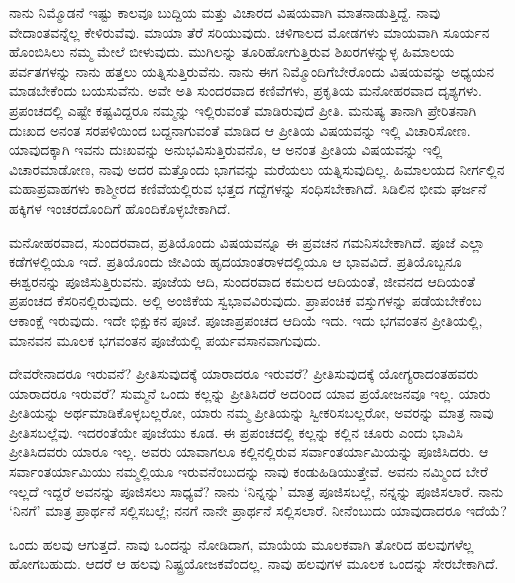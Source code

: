 ನಾನು ನಿಮ್ಮೊಡನೆ ಇಷ್ಟು ಕಾಲವೂ ಬುದ್ದಿಯ ಮತ್ತು ವಿಚಾರದ ವಿಷಯವಾಗಿ ಮಾತನಾಡುತ್ತಿದ್ದೆ. ನಾವು ವೇದಾಂತವನ್ನೆಲ್ಲ ಕೇಳಿರುವೆವು. ಮಾಯಾ ತೆರೆ ಸರಿಯುವುದು. ಚಳಿಗಾಲದ ಮೋಡಗಳು ಮಾಯವಾಗಿ ಸೂರ್ಯನ ಹೊಂಬಿಸಿಲು ನಮ್ಮ ಮೇಲೆ ಬೀಳುವುದು. ಮುಗಿಲನ್ನು ತೂರಿಹೋಗುತ್ತಿರುವ ಶಿಖರಗಳನ್ನುಳ್ಳ ಹಿಮಾಲಯ ಪರ್ವತಗಳನ್ನು ನಾನು ಹತ್ತಲು ಯತ್ನಿಸುತ್ತಿರುವೆನು. ನಾನು ಈಗ ನಿಮ್ಮೊಂದಿಗೆ\break ಬೇರೊಂದು ವಿಷಯವನ್ನು ಅಧ್ಯಯನ ಮಾಡಬೇಕೆಂದು ಬಯಸುವೆನು. ಅವೇ ಅತಿ ಸುಂದರವಾದ ಕಣಿವೆಗಳು, ಪ್ರಕೃತಿಯ ಮನೋಹರವಾದ ದೃಶ್ಯಗಳು. ಪ್ರಪಂಚದಲ್ಲಿ ಎಷ್ಟೇ ಕಷ್ಟವಿದ್ದರೂ ನಮ್ಮನ್ನು ಇಲ್ಲಿರುವಂತೆ ಮಾಡಿರುವುದೆ ಪ್ರೀತಿ. ಮನುಷ್ಯ ತಾನಾಗಿ ಪ್ರೇರಿತನಾಗಿ ದುಃಖದ ಅನಂತ ಸರಪಳಿಯಿಂದ ಬದ್ದನಾಗುವಂತೆ ಮಾಡಿದ ಆ ಪ್ರೀತಿಯ ವಿಷಯವನ್ನು ಇಲ್ಲಿ ವಿಚಾರಿಸೋಣ. ಯಾವುದಕ್ಕಾಗಿ ಇವನು ದುಃಖವನ್ನು ಅನುಭವಿಸುತ್ತಿರುವನೊ, ಆ ಅನಂತ ಪ್ರೀತಿಯ ವಿಷಯವನ್ನು ಇಲ್ಲಿ ವಿಚಾರಮಾಡೋಣ, ನಾವು ಅದರ ಮತ್ತೊಂದು ಭಾಗವನ್ನು ಮರೆಯಲು ಯತ್ನಿಸುವುದಿಲ್ಲ. ಹಿಮಾಲಯದ ನೀರ್ಗಲ್ಲಿನ ಮಹಾಪ್ರವಾಹಗಳು ಕಾಶ್ಮೀರದ ಕಣಿವೆಯಲ್ಲಿರುವ ಭತ್ತದ ಗದ್ದೆಗಳನ್ನು ಸಂಧಿಸಬೇಕಾಗಿದೆ. ಸಿಡಿಲಿನ ಭೀಮ ಘರ್ಜನೆ ಹಕ್ಕಿಗಳ ಇಂಚರದೊಂದಿಗೆ ಹೊಂದಿಕೊಳ್ಳಬೇಕಾಗಿದೆ.

ಮನೋಹರವಾದ, ಸುಂದರವಾದ, ಪ್ರತಿಯೊಂದು ವಿಷಯವನ್ನೂ ಈ ಪ್ರವಚನ ಗಮನಿಸಬೇಕಾಗಿದೆ. ಪೂಜೆ ಎಲ್ಲಾ ಕಡೆಗಳಲ್ಲಿಯೂ ಇದೆ. ಪ್ರತಿಯೊಂದು ಜೀವಿಯ ಹೃದಯಾಂತರಾಳದಲ್ಲಿಯೂ ಆ ಭಾವವಿದೆ. ಪ್ರತಿಯೊಬ್ಬನೂ ಈಶ್ವರನನ್ನು ಪೂಜಿಸುತ್ತಿರುವನು. ಪೂಜೆಯ ಆದಿ, ಸುಂದರವಾದ ಕಮಲದ ಆದಿಯಂತೆ, ಜೀವನದ ಆದಿಯಂತೆ ಪ್ರಪಂಚದ ಕೆಸರಿನಲ್ಲಿರುವುದು. ಅಲ್ಲಿ ಅಂಜಿಕೆಯ ಸ್ವಭಾವವಿರುವುದು. ಪ್ರಾಪಂಚಿಕ ವಸ್ತುಗಳನ್ನು ಪಡೆಯಬೇಕೆಂಬ ಆಕಾಂಕ್ಷೆ ಇರುವುದು. ಇದೇ ಭಿಕ್ಷುಕನ ಪೂಜೆ. ಪೂಜಾಪ್ರಪಂಚದ ಆದಿಯೆ ಇದು. ಇದು ಭಗವಂತನ ಪ್ರೀತಿಯಲ್ಲಿ, ಮಾನವನ ಮೂಲಕ ಭಗವಂತನ ಪೂಜೆಯಲ್ಲಿ ಪರ್ಯವಸಾನವಾಗುವುದು.

ದೇವರೇನಾದರೂ ಇರುವನೆ? ಪ್ರೀತಿಸುವುದಕ್ಕೆ ಯಾರಾದರೂ ಇರುವರೆ? ಪ್ರೀತಿಸುವುದಕ್ಕೆ ಯೋಗ್ಯರಾದಂತಹವರು ಯಾರಾದರೂ ಇರುವರೆ? ಸುಮ್ಮನೆ ಒಂದು ಕಲ್ಲನ್ನು ಪ್ರೀತಿಸಿದರೆ ಅದರಿಂದ ಯಾವ ಪ್ರಯೋಜನವೂ ಇಲ್ಲ. ಯಾರು ಪ್ರೀತಿಯನ್ನು ಅರ್ಥಮಾಡಿಕೊಳ್ಳಬಲ್ಲರೋ, ಯಾರು ನಮ್ಮ ಪ್ರೀತಿಯನ್ನು ಸ್ವೀಕರಿಸಬಲ್ಲರೋ, ಅವರನ್ನು ಮಾತ್ರ ನಾವು ಪ್ರೀತಿಸಬಲ್ಲೆವು. ಇದರಂತೆಯೇ ಪೂಜೆಯು ಕೂಡ. ಈ ಪ್ರಪಂಚದಲ್ಲಿ ಕಲ್ಲನ್ನು ಕಲ್ಲಿನ ಚೂರು ಎಂದು ಭಾವಿಸಿ ಪ್ರೀತಿಸಿದವರು ಯಾರೂ ಇಲ್ಲ. ಅವರು ಯಾವಾಗಲೂ ಕಲ್ಲಿನಲ್ಲಿರುವ ಸರ್ವಾಂತರ್ಯಾಮಿಯನ್ನು ಪೂಜಿಸಿದರು. ಆ ಸರ್ವಾಂತರ್ಯಾಮಿಯು ನಮ್ಮಲ್ಲಿಯೂ ಇರುವನೆಂಬುದನ್ನು ನಾವು ಕಂಡುಹಿಡಿಯುತ್ತೇವೆ. ಅವನು ನಮ್ಮಿಂದ ಬೇರೆ ಇಲ್ಲದೆ ಇದ್ದರೆ ಅವನನ್ನು ಪೂಜಿಸಲು ಸಾಧ್ಯವೆ? ನಾನು `ನಿನ್ನನ್ನು' ಮಾತ್ರ ಪೂಜಿಸಬಲ್ಲೆ, ನನ್ನನ್ನು ಪೂಜಿಸಲಾರೆ. ನಾನು `ನಿನಗೆ' ಮಾತ್ರ ಪ್ರಾರ್ಥನೆ ಸಲ್ಲಿಸಬಲ್ಲೆ; ನನಗೆ ನಾನೇ ಪ್ರಾರ್ಥನೆ ಸಲ್ಲಿಸಲಾರೆ. ನೀನೆಂಬುದು ಯಾವುದಾದರೂ ಇದೆಯೆ?

ಒಂದು ಹಲವು ಆಗುತ್ತದೆ. ನಾವು ಒಂದನ್ನು ನೋಡಿದಾಗ, ಮಾಯೆಯ ಮೂಲಕವಾಗಿ ತೋರಿದ ಹಲವುಗಳೆಲ್ಲ ಹೋಗಬಹುದು. ಆದರೆ ಆ ಹಲವು ನಿಷ್ಟ್ರಯೋಜಕವೆಂದಲ್ಲ. ನಾವು ಹಲವುಗಳ ಮೂಲಕ ಒಂದನ್ನು ಸೇರಬೇಕಾಗಿದೆ.


